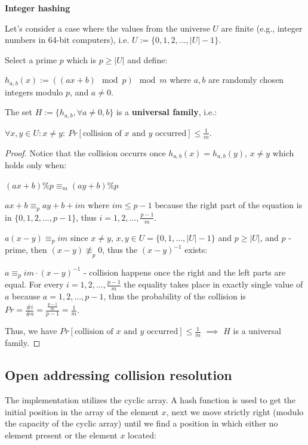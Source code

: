 \begin{theorem}\textbf{Integer hashing}

    Let's consider a case where the values from the universe $U$ are finite (e.g., integer numbers in 64-bit computers), i.e. $U := \{0, 1, 2, ..., |U| - 1\}$.

    Select a prime $p$ which is $p \geq |U|$ and define:

    $h_{a, b}(x) := ((ax + b) \mod p) \mod m$ where $a, b$ are randomly chosen integers modulo $p$, and $a \neq 0$.

    The set $H := \{h_{a, b}, \forall a \neq 0, b\}$ is a \textbf{universal family}, i.e.:

    $\forall x, y \in U: x \neq y: \ Pr[\text{collision of $x$ and $y$ occurred}] \leq \frac{1}{m}$.

\end{theorem}

\begin{proof}

    Notice that the collision occurrs once $h_{a,b}(x) = h_{a,b}(y)$, $x \neq y$ which holds only when:

    $(ax + b) \% p \equiv_{m} (ay + b) \% p$

    $ax + b \equiv_{p} ay + b + im$ where $im \leq p-1$ because the right part of the equation is in $\{0, 1, 2, ..., p-1\}$, thus $i=1, 2, ..., \frac{p-1}{m}$.

    $a (x-y) \equiv_{p} im$ since $x \neq y$, $x, y \in U = \{0, 1, ..., |U|-1\}$ and $p \geq |U|$, and $p$ - prime, then $(x-y) \not\equiv_{p} 0$, thus the $(x-y)^{-1}$ exists:

    $a \equiv_{p} im \cdot (x-y)^{-1}$ - collision happens once the right and the left parts are equal. For every $i=1, 2, ..., \frac{p-1}{m}$ the equality takes place in exactly single value of $a$ because $a=1, 2, ..., p-1$, thus the probability of the collision is $Pr=\frac{\#i}{\#a} = \frac{\frac{p-1}{m}}{p-1} = \frac{1}{m}$.

    Thus, we have $Pr[\text{collision of $x$ and $y$ occurred}] \leq \frac{1}{m}$ $\implies$ $H$ is a universal family.

\end{proof}

\subsection{Open addressing collision resolution}

The implementation utilizes the cyclic array. A hash function is used to get the initial position in the array of the element $x$, next we move strictly right (modulo the capacity of the cyclic array) until we find a position in which either no element present or the element $x$ located:


